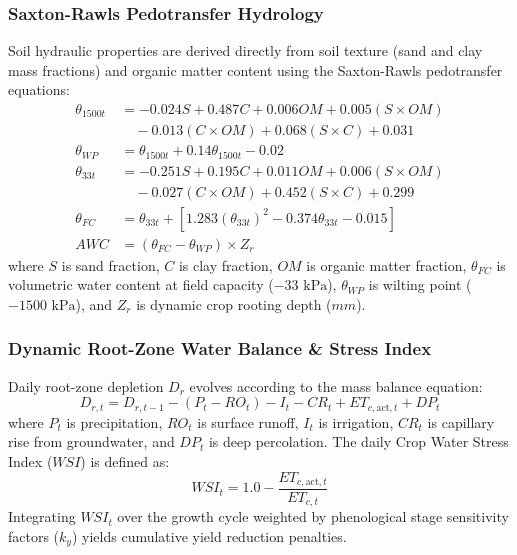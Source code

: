 \documentclass[10pt,twocolumn]{article}
\begin{document}
\subsubsection{Saxton-Rawls Pedotransfer Hydrology}
Soil hydraulic properties are derived directly from soil texture (sand and clay mass fractions) and organic matter content using the Saxton-Rawls pedotransfer equations:
\begin{align}
\theta_{1500t} &= -0.024 S + 0.487 C + 0.006 OM + 0.005 (S \times OM) \nonumber \\
&\quad - 0.013 (C \times OM) + 0.068 (S \times C) + 0.031 \\
\theta_{WP} &= \theta_{1500t} + 0.14 \theta_{1500t} - 0.02 \\
\theta_{33t} &= -0.251 S + 0.195 C + 0.011 OM + 0.006 (S \times OM) \nonumber \\
&\quad - 0.027 (C \times OM) + 0.452 (S \times C) + 0.299 \\
\theta_{FC} &= \theta_{33t} + \left[1.283 (\theta_{33t})^2 - 0.374 \theta_{33t} - 0.015\right] \\
AWC &= (\theta_{FC} - \theta_{WP}) \times Z_r
\end{align}
where $S$ is sand fraction, $C$ is clay fraction, $OM$ is organic matter fraction, $\theta_{FC}$ is volumetric water content at field capacity ($-33\text{ kPa}$), $\theta_{WP}$ is wilting point ($-1500\text{ kPa}$), and $Z_r$ is dynamic crop rooting depth ($mm$).

\subsubsection{Dynamic Root-Zone Water Balance \& Stress Index}
Daily root-zone depletion $D_r$ evolves according to the mass balance equation:
\begin{equation}
D_{r,t} = D_{r,t-1} - (P_t - RO_t) - I_t - CR_t + ET_{c,\text{act},t} + DP_t
\end{equation}
where $P_t$ is precipitation, $RO_t$ is surface runoff, $I_t$ is irrigation, $CR_t$ is capillary rise from groundwater, and $DP_t$ is deep percolation. The daily Crop Water Stress Index ($WSI$) is defined as:
\begin{equation}
WSI_t = 1.0 - \frac{ET_{c,\text{act},t}}{ET_{c,t}}
\end{equation}
Integrating $WSI_t$ over the growth cycle weighted by phenological stage sensitivity factors ($k_y$) yields cumulative yield reduction penalties.
\end{document}
